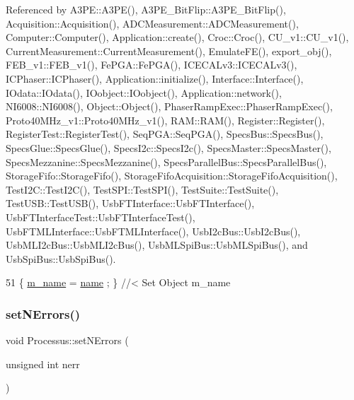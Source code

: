 Referenced by A3\+P\+E\+::\+A3\+P\+E(), A3\+P\+E\+\_\+\+Bit\+Flip\+::\+A3\+P\+E\+\_\+\+Bit\+Flip(), Acquisition\+::\+Acquisition(), A\+D\+C\+Measurement\+::\+A\+D\+C\+Measurement(), Computer\+::\+Computer(), Application\+::create(), Croc\+::\+Croc(), C\+U\+\_\+v1\+::\+C\+U\+\_\+v1(), Current\+Measurement\+::\+Current\+Measurement(), Emulate\+F\+E(), export\+\_\+obj(), F\+E\+B\+\_\+v1\+::\+F\+E\+B\+\_\+v1(), Fe\+P\+G\+A\+::\+Fe\+P\+G\+A(), I\+C\+E\+C\+A\+Lv3\+::\+I\+C\+E\+C\+A\+Lv3(), I\+C\+Phaser\+::\+I\+C\+Phaser(), Application\+::initialize(), Interface\+::\+Interface(), I\+Odata\+::\+I\+Odata(), I\+Oobject\+::\+I\+Oobject(), Application\+::network(), N\+I6008\+::\+N\+I6008(), Object\+::\+Object(), Phaser\+Ramp\+Exec\+::\+Phaser\+Ramp\+Exec(), Proto40\+M\+Hz\+\_\+v1\+::\+Proto40\+M\+Hz\+\_\+v1(), R\+A\+M\+::\+R\+A\+M(), Register\+::\+Register(), Register\+Test\+::\+Register\+Test(), Seq\+P\+G\+A\+::\+Seq\+P\+G\+A(), Specs\+Bus\+::\+Specs\+Bus(), Specs\+Glue\+::\+Specs\+Glue(), Specs\+I2c\+::\+Specs\+I2c(), Specs\+Master\+::\+Specs\+Master(), Specs\+Mezzanine\+::\+Specs\+Mezzanine(), Specs\+Parallel\+Bus\+::\+Specs\+Parallel\+Bus(), Storage\+Fifo\+::\+Storage\+Fifo(), Storage\+Fifo\+Acquisition\+::\+Storage\+Fifo\+Acquisition(), Test\+I2\+C\+::\+Test\+I2\+C(), Test\+S\+P\+I\+::\+Test\+S\+P\+I(), Test\+Suite\+::\+Test\+Suite(), Test\+U\+S\+B\+::\+Test\+U\+S\+B(), Usb\+F\+T\+Interface\+::\+Usb\+F\+T\+Interface(), Usb\+F\+T\+Interface\+Test\+::\+Usb\+F\+T\+Interface\+Test(), Usb\+F\+T\+M\+L\+Interface\+::\+Usb\+F\+T\+M\+L\+Interface(), Usb\+I2c\+Bus\+::\+Usb\+I2c\+Bus(), Usb\+M\+L\+I2c\+Bus\+::\+Usb\+M\+L\+I2c\+Bus(), Usb\+M\+L\+Spi\+Bus\+::\+Usb\+M\+L\+Spi\+Bus(), and Usb\+Spi\+Bus\+::\+Usb\+Spi\+Bus().


\begin{DoxyCode}
51 \{ \hyperlink{classObject_a8b83c95c705d2c3ba0d081fe1710f48d}{m\_name}  = \hyperlink{classObject_a300f4c05dd468c7bb8b3c968868443c1}{name}  ; \} \textcolor{comment}{//< Set Object m\_name}
\end{DoxyCode}
\mbox{\label{classProcessus_a831b027b9cf18ab56fa6147b5d3055da}} 
\subsubsection{\texorpdfstring{set\+N\+Errors()}{setNErrors()}}
{\footnotesize\ttfamily void Processus\+::set\+N\+Errors (\begin{DoxyParamCaption}\item[{unsigned int}]{nerr }\end{DoxyParamCaption})\hspace{0.3cm}{\ttfamily [inherited]}}

